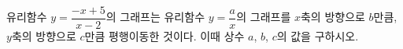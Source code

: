 유리함수 $y=\dfrac{-x+5}{x-2}$의 그래프는 유리함수 $y=\dfrac{a}{x}$의 그래프를 $x$축의 방향으로 $b$만큼, $y$축의 방향으로 $c$만큼 평행이동한 것이다. 이때 상수 $a$, $b$, $c$의 값을 구하시오.
